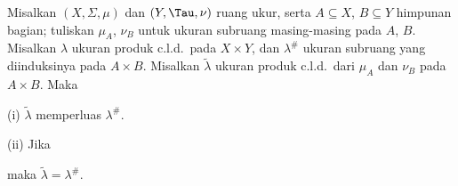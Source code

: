  Misalkan $(X,\Sigma,\mu)$ dan $(Y,\Tau,\nu)$
ruang ukur, serta $A\subseteq X$, $B\subseteq Y$ himpunan bagian; tuliskan
$\mu_A$, $\nu_B$ untuk ukuran subruang masing-masing pada $A$, $B$.
Misalkan $\lambda$ ukuran produk c.l.d.\ pada $X\times Y$, dan
$\lambda^{\#}$
ukuran subruang yang diinduksinya pada $A\times B$. Misalkan $\tilde\lambda$
ukuran produk c.l.d.\ dari $\mu_A$ dan $\nu_B$ pada $A\times B$. Maka

(i) $\tilde\lambda$ memperluas $\lambda^{\#}$.

(ii) Jika




\noindent maka $\tilde\lambda=\lambda^{\#}$.

